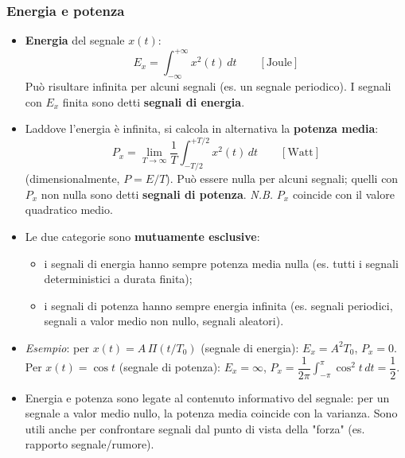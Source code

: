 \documentclass[12pt, a4paper]{article}
\begin{document}
\subsubsection{Energia e potenza}
\begin{itemize}
    \item \textbf{Energia} del segnale $x(t)$:
    $$E_x = \int_{-\infty}^{+\infty} x^2(t)\,dt \qquad [\text{Joule}]$$
    Può risultare infinita per alcuni segnali (es. un segnale periodico). I segnali con $E_x$ finita sono detti \textcolor{orange!80!black}{\textbf{segnali di energia}}.
    \item Laddove l'energia è infinita, si calcola in alternativa la \textbf{potenza media}:
    $$P_x = \lim_{T\to\infty} \frac1T \int_{-T/2}^{+T/2} x^2(t)\,dt \qquad [\text{Watt}]$$
    (dimensionalmente, $P=E/T$). Può essere nulla per alcuni segnali; quelli con $P_x$ non nulla sono detti \textcolor{orange!80!black}{\textbf{segnali di potenza}}. \textit{N.B.} $P_x$ coincide con il valore quadratico medio.
    \item Le due categorie sono \textbf{mutuamente esclusive}:
    \begin{itemize}
        \item i segnali di energia hanno sempre potenza media nulla (es. tutti i segnali deterministici a durata finita);
        \item i segnali di potenza hanno sempre energia infinita (es. segnali periodici, segnali a valor medio non nullo, segnali aleatori).
    \end{itemize}
    \item \textit{Esempio}: per $x(t)=A\,\Pi(t/T_0)$ (segnale di energia): $E_x = A^2T_0$, $P_x=0$. Per $x(t)=\cos t$ (segnale di potenza): $E_x=\infty$, $P_x = \dfrac{1}{2\pi}\displaystyle\int_{-\pi}^{\pi}\cos^2t\,dt = \dfrac12$.
    \item Energia e potenza sono legate al contenuto informativo del segnale: per un segnale a valor medio nullo, la potenza media coincide con la varianza. Sono utili anche per confrontare segnali dal punto di vista della "forza" (es. rapporto segnale/rumore).
\end{itemize}
\end{document}
